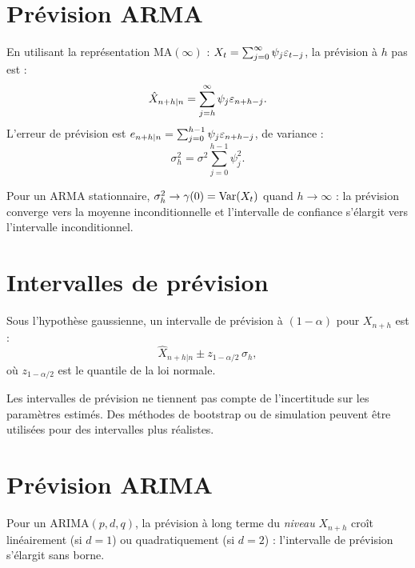 \section{Pr\'evision ARMA}

\begin{theoreme}
En utilisant la repr\'esentation MA$(\infty)$ : $X_t=\sum_{j=0}^{\infty}\psi_j\varepsilon_{t-j}$, la pr\'evision \`a $h$ pas est :
\[
\hat{X}_{n+h|n} = \sum_{j=h}^{\infty}\psi_j\varepsilon_{n+h-j}.
\]
L'erreur de pr\'evision est $e_{n+h|n}=\sum_{j=0}^{h-1}\psi_j\varepsilon_{n+h-j}$, de variance :
\[
\sigma_h^2 = \sigma^2\sum_{j=0}^{h-1}\psi_j^2.
\]
\end{theoreme}

\begin{corollaire}
Pour un ARMA stationnaire, $\sigma_h^2\to\gamma(0)=\operatorname{Var}(X_t)$ quand $h\to\infty$ : la pr\'evision converge vers la moyenne inconditionnelle et l'intervalle de confiance s'\'elargit vers l'intervalle inconditionnel.
\end{corollaire}

\section{Intervalles de pr\'evision}

\begin{definition}
Sous l'hypoth\`ese gaussienne, un intervalle de pr\'evision \`a $(1-\alpha)$ pour $X_{n+h}$ est :
\[
\hat{X}_{n+h|n} \pm z_{1-\alpha/2}\,\sigma_h,
\]
o\`u $z_{1-\alpha/2}$ est le quantile de la loi normale.
\end{definition}

\begin{attention}
Les intervalles de pr\'evision ne tiennent pas compte de l'incertitude sur les param\`etres estim\'es. Des m\'ethodes de bootstrap ou de simulation peuvent \^etre utilis\'ees pour des intervalles plus r\'ealistes.
\end{attention}

\section{Pr\'evision ARIMA}

\begin{theoreme}
Pour un ARIMA$(p,d,q)$, la pr\'evision \`a long terme du \emph{niveau} $X_{n+h}$ cro\^it lin\'eairement (si $d=1$) ou quadratiquement (si $d=2$) : l'intervalle de pr\'evision s'\'elargit sans borne.
\end{theoreme}

